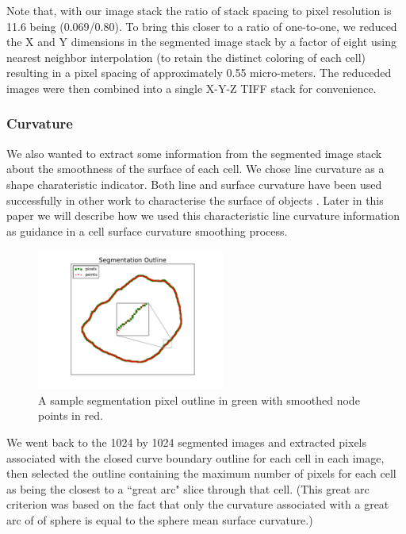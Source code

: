 \documentclass[a4paper,10pt]{article}
\begin{document}
Note that, with our image stack the ratio of stack spacing to pixel resolution is 11.6 being (0.069/0.80). To bring this closer to a ratio of one-to-one, we reduced the X and Y dimensions in the segmented image stack by a factor of eight using nearest neighbor interpolation (to retain the distinct coloring of each cell) resulting in a pixel spacing of approximately 0.55 micro-meters.  The reduceded images were then combined into a single X-Y-Z TIFF stack for convenience.\\

\subsubsection{Curvature}

We also wanted to extract some information from the segmented image stack about the smoothness of the surface of each cell. We chose line curvature as a shape charateristic indicator. Both line and surface curvature have been used successfully in other work to characterise the surface of objects \cite{Rugis_2005_SCMMD, Rugis_2006_SISCE}. Later in this paper we will describe how we used this characteristic line curvature information as guidance in a cell surface curvature smoothing process.\\

\begin{figure}[H]
\begin{center}
\includegraphics[width=0.55\textwidth]{images/outline.pdf}
\end{center}
\vspace{-5mm}
\caption{A sample segmentation pixel outline in green with smoothed node points in red.}
\label{fig:slice_outline}
\end{figure}

We went back to the 1024 by 1024 segmented images and extracted pixels associated with the closed curve boundary outline for each cell in each  image, then selected the outline containing the maximum number of pixels for each cell as being the closest to a ``great arc" slice through that cell. (This great arc criterion was based on the fact that only the curvature associated with a great arc of of sphere is equal to the sphere mean surface curvature.)\\
\end{document}
